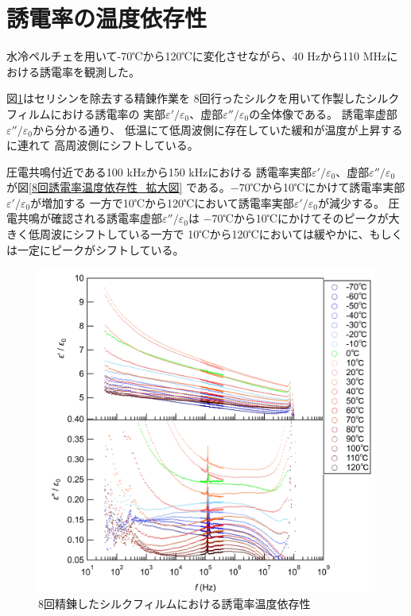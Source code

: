 \documentclass[dvipdfmx,12pt,a4paper]{jreport}
\begin{document}
			\section{誘電率の温度依存性}
			水冷ペルチェを用いて-70℃から120℃に変化させながら、40 Hzから110 MHzにおける誘電率を観測した。
			
			図\ref{8回誘電率温度依存性}はセリシンを除去する精錬作業を
			8回行ったシルクを用いて作製したシルクフィルムにおける誘電率の
			実部$\varepsilon'/\varepsilon_0$、虚部$\varepsilon''/\varepsilon_0$の全体像である。
			誘電率虚部$\varepsilon''/\varepsilon_0$から分かる通り、
			低温にて低周波側に存在していた緩和が温度が上昇するに連れて
			高周波側にシフトしている。

			圧電共鳴付近である100 kHzから150 kHzにおける
			誘電率実部$\varepsilon'/\varepsilon_0$、虚部$\varepsilon''/\varepsilon_0$
			が図\ref{8回誘電率温度依存性_拡大図}
			である。$-70$℃から10℃にかけて誘電率実部$\varepsilon'/\varepsilon_0$が増加する
			一方で10℃から120℃において誘電率実部$\varepsilon'/\varepsilon_0$が減少する。
			圧電共鳴が確認される誘電率虚部$\varepsilon''/\varepsilon_0$は
			$-70$℃から10℃にかけてそのピークが大きく低周波にシフトしている一方で
			10℃から120℃においては緩やかに、もしくは一定にピークがシフトしている。
			\begin{figure}[H]
				\centering
				\includegraphics[width=\linewidth]{8回_誘電率温度依存性.jpg}
				\caption{8回精錬したシルクフィルムにおける誘電率温度依存性}
				\label{8回誘電率温度依存性}
			\end{figure}
\end{document}
